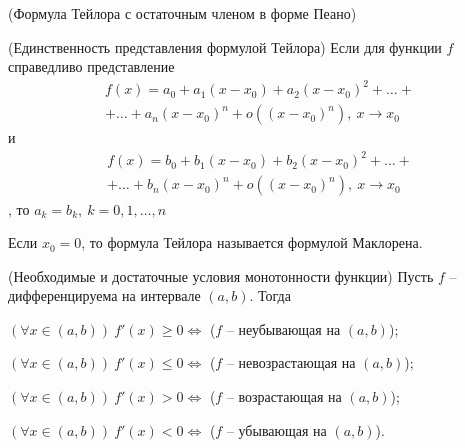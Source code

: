 \begin{multicols}{2}
\begin{theorema}{(Формула Тейлора с остаточным членом в форме Пеано)}{}
    \end{theorema}
    \begin{theorema}{(Единственность представления формулой Тейлора)}{}
         Если для функции $f$ справедливо представление \[
            \begin{array}{c}
                f(x) = a_0 + a_1(x-x_0) + a_2(x-x_0)^2 + \ldots + \\ + \ldots + a_n(x-x_0)^n + o((x-x_0)^n),\ x \to x_0                
            \end{array}
        \] и \[
            \begin{array}{c}
                f(x) = b_0 + b_1(x-x_0) + b_2(x-x_0)^2 + \ldots + \\ + \ldots + b_n(x-x_0)^n + o((x-x_0)^n), \ x\to x_0                
            \end{array}
    \], то $a_k = b_k,\ k = 0,1,\ldots, n$
    \end{theorema}
    Если $x_0 = 0$, то формула Тейлора называется формулой Маклорена.
    \begin{theorema}{(Необходимые и достаточные условия монотонности функции)}{}
         Пусть $f$ -- дифференцируема на интервале $(a,b)$. Тогда \begin{enumerate*}
            \item $(\forall x \in (a,b))\ f'(x) \geq 0 \Leftrightarrow$ ($f$ -- неубывающая на $(a,b)$);
            \item $(\forall x \in (a,b))\ f'(x) \leq 0 \Leftrightarrow$ ($f$ -- невозрастающая на $(a,b)$);
            \item $(\forall x \in (a,b))\ f'(x) > 0 \Leftrightarrow$ ($f$ -- возрастающая на $(a,b)$);
            \item $(\forall x \in (a,b))\ f'(x) < 0 \Leftrightarrow$ ($f$ -- убывающая на $(a,b)$). 
    \end{enumerate*}
    \end{theorema}


\end{multicols}
